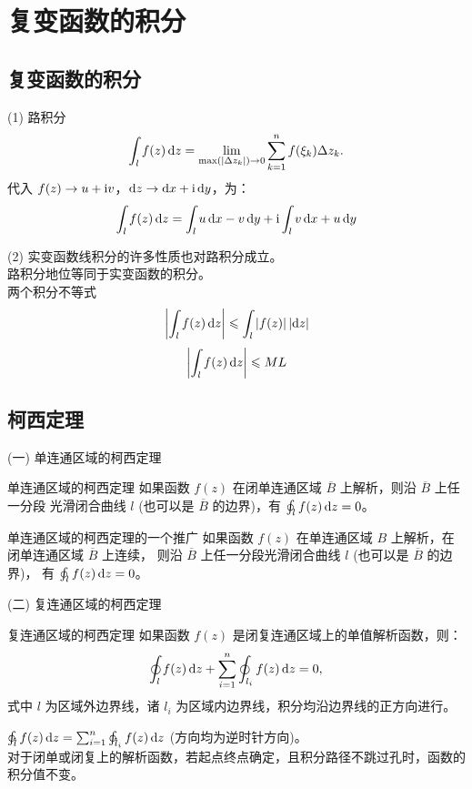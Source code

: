 \documentclass[12pt, a4paper, oneside, UTF8]{ctexbook}
\begin{document}
% 
\else
\fi

\chapter{复变函数的积分}

\section{复变函数的积分}

\noindent (1) 路积分 
\[\int_{l} f(z) \mathop{}\!\mathrm{d} z = \lim_{\max(\left\lvert \Delta z_k \right\rvert) \to 0} 
\sum_{k=1}^{n} f(\xi_k) \Delta z_k. \]
代入 $f(z)\to u+\mathrm{i} v$，$\mathop{}\!\mathrm{d} z\to \mathop{}\!\mathrm{d} x +\mathrm{i} \mathop{}\!\mathrm{d} y$，为：
\begin{equation} \label{eq:路积分转化}
    \int_{l} f(z) \mathop{}\!\mathrm{d} z = \int_{l} u \mathop{}\!\mathrm{d} x - v \mathop{}\!\mathrm{d} y + \mathrm{i} \int_{l} v \mathop{}\!\mathrm{d} x + u \mathop{}\!\mathrm{d} y
\end{equation}

\noindent (2) 实变函数线积分的许多性质也对路积分成立。\\
 路积分地位等同于实变函数的积分。\\
 两个积分不等式
\[\left\lvert \int_{l} f(z) \mathop{}\!\mathrm{d} z \right\rvert \leqslant 
\int_{l} \left\lvert f(z) \right\rvert \left\lvert \mathop{}\!\mathrm{d} z \right\rvert \]
\[\left\lvert \int_{l} f(z) \mathop{}\!\mathrm{d} z \right\rvert \leqslant M L \]

\section{柯西定理}

\noindent (一) 单连通区域的柯西定理

\begin{them}{单连通区域的柯西定理}{}
    如果函数 $f(z)$ 在闭单连通区域 $\overline{B}$ 上解析，则沿 $\overline{B}$ 上任一分段
    光滑闭合曲线 $l$ (也可以是 $\overline{B}$ 的边界)，有 $\oint_{l} f(z) \mathop{}\!\mathrm{d} z = 0$。
\end{them}
\begin{them}{单连通区域的柯西定理的一个推广}{}
    如果函数 $f(z)$ 在单连通区域 $B$ 上解析，在闭单连通区域 $\overline{B}$ 上连续，
    则沿 $\overline{B}$ 上任一分段光滑闭合曲线 $l$ (也可以是 $\overline{B}$ 的边界)，
    有 $\oint_{l} f(z) \mathop{}\!\mathrm{d} z = 0$。
\end{them}

\noindent (二) 复连通区域的柯西定理
\begin{them}{复连通区域的柯西定理}{}
    如果函数 $f(z)$ 是闭复连通区域上的单值解析函数，则：
    \[\oint_{l} f(z) \mathop{}\!\mathrm{d} z + \sum_{i=1}^{n} \oint_{l_i} f(z) \mathop{}\!\mathrm{d} z = 0, \]
    式中 $l$ 为区域外边界线，诸 $l_i$ 为区域内边界线，积分均沿边界线的正方向进行。
\end{them}
\noindent {}  $\ointctrclockwise_{l} f(z) \dif z = \sum_{i=1}^{n} 
\ointctrclockwise_{l_i} f(z) \dif z$ (方向均为逆时针方向)。\\
 对于闭单或闭复上的解析函数，若起点终点确定，且积分路径不跳过孔时，函数的积分值不变。
\end{document}
